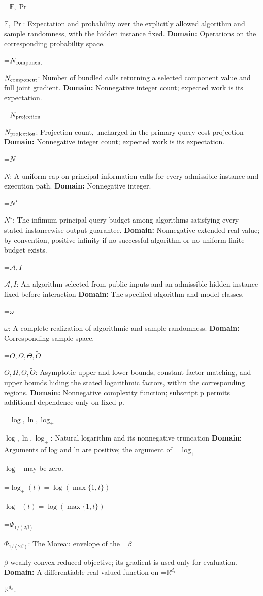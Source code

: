 \documentclass[10pt,a4paper]{article}
\newcommand{\AtlasMath}[1]{\par\begingroup\centering\setbox0=\hbox{$\displaystyle #1$}\ifdim\wd0>1.4\linewidth\typeout{ATLAS WIDE FORMULA: \the\wd0}\fi\ifdim\wd0>\linewidth\resizebox{\linewidth}{!}{\box0}\else\box0\fi\par\endgroup}
\newcommand{\AtlasInlineMath}[1]{\begingroup\setbox0=\hbox{$#1$}\ifdim\wd0>.4\linewidth\endgroup\AtlasMath{#1}\else\endgroup$#1$\fi}
\begin{document}
\AtlasInlineMath{\mathbb E,\Pr}: Expectation and probability over the explicitly allowed algorithm and sample randomness, with the hidden instance fixed. \textbf{Domain:} Operations on the corresponding probability space.

\AtlasInlineMath{N_{\rm component}}: Number of bundled calls returning a selected component value and full joint gradient. \textbf{Domain:} Nonnegative integer count; expected work is its expectation.

\AtlasInlineMath{N_{\rm projection}}: Projection count, uncharged in the primary query-cost projection \textbf{Domain:} Nonnegative integer count; expected work is its expectation.

\AtlasInlineMath{N}: A uniform cap on principal information calls for every admissible instance and execution path. \textbf{Domain:} Nonnegative integer.

\AtlasInlineMath{N^\star}: The infimum principal query budget among algorithms satisfying every stated instancewise output guarantee. \textbf{Domain:} Nonnegative extended real value; by convention, positive infinity if no successful algorithm or no uniform finite budget exists.

\AtlasInlineMath{\mathcal A,I}: An algorithm selected from public inputs and an admissible hidden instance fixed before interaction \textbf{Domain:} The specified algorithm and model classes.

\AtlasInlineMath{\omega}: A complete realization of algorithmic and sample randomness. \textbf{Domain:} Corresponding sample space.

\AtlasInlineMath{O,\Omega,\Theta,\widetilde O}: Asymptotic upper and lower bounds, constant-factor matching, and upper bounds hiding the stated logarithmic factors, within the corresponding regions. \textbf{Domain:} Nonnegative complexity function; subscript p permits additional dependence only on fixed p.

\AtlasInlineMath{\log,\ln,\log_+}: Natural logarithm and its nonnegative truncation \textbf{Domain:} Arguments of log and ln are positive; the argument of \AtlasInlineMath{\log_+} may be zero.

\AtlasInlineMath{\log_+(t)=\log(\max\{1,t\})}

\AtlasInlineMath{\Phi_{1/(2\beta)}}: The Moreau envelope of the \AtlasInlineMath{\beta}-weakly convex reduced objective; its gradient is used only for evaluation. \textbf{Domain:} A differentiable real-valued function on \AtlasInlineMath{\mathbb R^{d_x}}.
\end{document}
